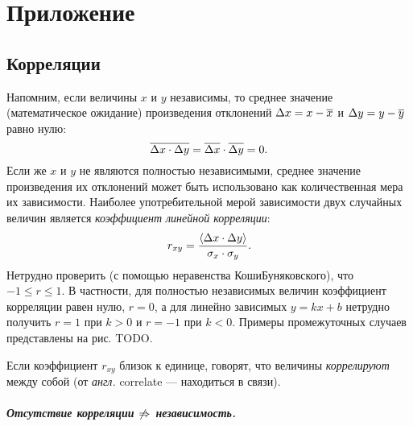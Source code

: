 \chapter{Приложение}

\small

\section{Корреляции}
\label{sec:correlation}

Напомним, если величины $x$ и $y$ независимы, то среднее значение (математическое ожидание) произведения отклонений $\Delta x = x-\overline{x}$ и $\Delta y = y - \overline{y}$
равно нулю:
\begin{equation*}
\overline{\Delta x\cdot\Delta y}=\overline{\Delta x}\cdot\overline{\Delta
y}=0.
\end{equation*}
Если же $x$ и $y$ не являются полностью независимыми, среднее значение произведения
их отклонений может быть использовано как количественная мера их зависимости.
Наиболее употребительной мерой зависимости двух случайных величин
является \emph{коэффициент линейной корреляции}:
\begin{equation}
r_{xy}=\frac{\left<\Delta x\cdot\Delta
y\right>}{\sigma_{x}\cdot\sigma_{y}}.\label{eq:pearson}
\end{equation}
Нетрудно проверить (с помощью неравенства Коши\textendash Буняковского),
что $-1\le r\le1$. В частности, для полностью независимых величин
коэффициент корреляции равен нулю, $r=0$, а для линейно зависимых
$y=kx+b$ нетрудно получить $r=1$ при $k>0$ и $r=-1$ при $k<0$.
Примеры промежуточных случаев представлены на рис. TODO.


Если коэффициент $r_{xy}$ близок к единице, говорят, что величины
\emph{коррелируют} между собой (от \emph{англ.} correlate ---
находиться в связи).


\paragraph{Отсутствие корреляции $\protect\not\Rightarrow$ независимость.}


